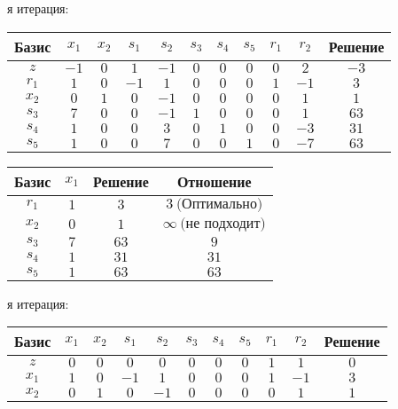 \documentclass{article}%
\begin{document}
\begin{flushleft}
\newline%
я итерация: %
\newline%
\newline%
\renewcommand{\arraystretch}{1.3}%
\begin{tabular}{|c|ccccccccc|c|}%
\hline%
Базис&$x_{1}$&$x_{2}$&$s_{1}$&$s_{2}$&$s_{3}$&$s_{4}$&$s_{5}$&$r_{1}$&$r_{2}$&Решение\\%
\hline%
$z$&$-1$&$0$&$1$&$-1$&$0$&$0$&$0$&$0$&$2$&$-3$\\%
\hline%
$r_{1}$&$1$&$0$&$-1$&$1$&$0$&$0$&$0$&$1$&$-1$&$3$\\%
$x_{2}$&$0$&$1$&$0$&$-1$&$0$&$0$&$0$&$0$&$1$&$1$\\%
$s_{3}$&$7$&$0$&$0$&$-1$&$1$&$0$&$0$&$0$&$1$&$63$\\%
$s_{4}$&$1$&$0$&$0$&$3$&$0$&$1$&$0$&$0$&$-3$&$31$\\%
$s_{5}$&$1$&$0$&$0$&$7$&$0$&$0$&$1$&$0$&$-7$&$63$\\%
\hline%
\end{tabular}%
\newline%
\newline%
\newline%
\begin{tabular}{|cccc|}%
\hline%
Базис&$x_{1}$&Решение&Отношение\\%
\hline%
$r_{1}$&$1$&$3$&$3\: \text{(Оптимально)}$\\%
$x_{2}$&$0$&$1$&$\infty \: \text{(не подходит)}$\\%
$s_{3}$&$7$&$63$&$9$\\%
$s_{4}$&$1$&$31$&$31$\\%
$s_{5}$&$1$&$63$&$63$\\%
\hline%
\end{tabular}%
\newline%
\newline%
я итерация: %
\newline%
\newline%
\renewcommand{\arraystretch}{1.3}%
\begin{tabular}{|c|ccccccccc|c|}%
\hline%
Базис&$x_{1}$&$x_{2}$&$s_{1}$&$s_{2}$&$s_{3}$&$s_{4}$&$s_{5}$&$r_{1}$&$r_{2}$&Решение\\%
\hline%
$z$&$0$&$0$&$0$&$0$&$0$&$0$&$0$&$1$&$1$&$0$\\%
\hline%
$x_{1}$&$1$&$0$&$-1$&$1$&$0$&$0$&$0$&$1$&$-1$&$3$\\%
$x_{2}$&$0$&$1$&$0$&$-1$&$0$&$0$&$0$&$0$&$1$&$1$\\%

\end{tabular}
\end{flushleft}
\end{document}
